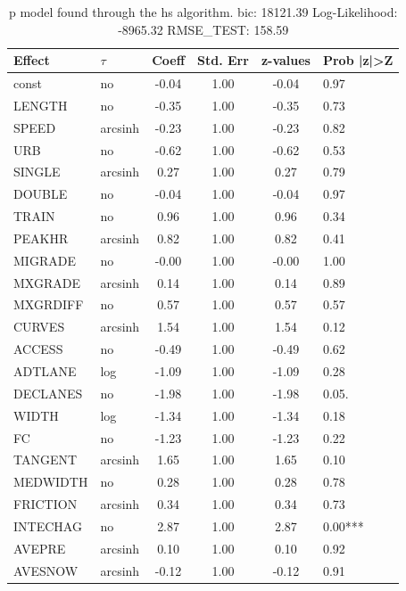 \begin{table}
	\caption{p model found through the hs algorithm. bic: 18121.39 Log-Likelihood: -8965.32 RMSE_TEST: 158.59}
	\begin{center}
		\begin{tabular}{|l|l|c|c|c|l|}
			\hline
			Effect & $\tau$ & Coeff & Std. Err & z-values & Prob |z|>Z \\
			\hline
			const & no & -0.04 & 1.00 & -0.04 & 0.97 \\
			\hline
			LENGTH & no & -0.35 & 1.00 & -0.35 & 0.73 \\
			\hline
			SPEED & arcsinh & -0.23 & 1.00 & -0.23 & 0.82 \\
			\hline
			URB & no & -0.62 & 1.00 & -0.62 & 0.53 \\
			\hline
			SINGLE & arcsinh & 0.27 & 1.00 & 0.27 & 0.79 \\
			\hline
			DOUBLE & no & -0.04 & 1.00 & -0.04 & 0.97 \\
			\hline
			TRAIN & no & 0.96 & 1.00 & 0.96 & 0.34 \\
			\hline
			PEAKHR & arcsinh & 0.82 & 1.00 & 0.82 & 0.41 \\
			\hline
			MIGRADE & no & -0.00 & 1.00 & -0.00 & 1.00 \\
			\hline
			MXGRADE & arcsinh & 0.14 & 1.00 & 0.14 & 0.89 \\
			\hline
			MXGRDIFF & no & 0.57 & 1.00 & 0.57 & 0.57 \\
			\hline
			CURVES & arcsinh & 1.54 & 1.00 & 1.54 & 0.12 \\
			\hline
			ACCESS & no & -0.49 & 1.00 & -0.49 & 0.62 \\
			\hline
			ADTLANE & log & -1.09 & 1.00 & -1.09 & 0.28 \\
			\hline
			DECLANES & no & -1.98 & 1.00 & -1.98 & 0.05. \\
			\hline
			WIDTH & log & -1.34 & 1.00 & -1.34 & 0.18 \\
			\hline
			FC & no & -1.23 & 1.00 & -1.23 & 0.22 \\
			\hline
			TANGENT & arcsinh & 1.65 & 1.00 & 1.65 & 0.10 \\
			\hline
			MEDWIDTH & no & 0.28 & 1.00 & 0.28 & 0.78 \\
			\hline
			FRICTION & arcsinh & 0.34 & 1.00 & 0.34 & 0.73 \\
			\hline
			INTECHAG & no & 2.87 & 1.00 & 2.87 & 0.00*** \\
			\hline
			AVEPRE & arcsinh & 0.10 & 1.00 & 0.10 & 0.92 \\
			\hline
			AVESNOW & arcsinh & -0.12 & 1.00 & -0.12 & 0.91 \\

\end{tabular}
\end{center}
\end{table}
